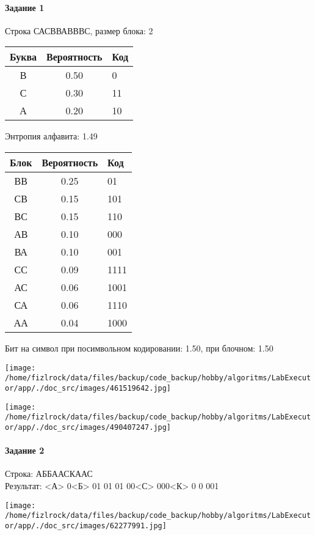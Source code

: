 \documentclass[a4paper, 12pt]{article}
\begin{document}
\paragraph{Задание 1}

Строка САСВВАВВВС, размер блока: 2
\begin{center}
 \begin{tabular}{ |c|c|l| } 
  \hline
     Буква & Вероятность & Код\\ \hline
В & 0.50 & 0\\\hline
С & 0.30 & 11\\\hline
А & 0.20 & 10
\\ \hline \end{tabular}
\end{center}
Энтропия алфавита: 1.49
\begin{center}
 \begin{tabular}{ |c|c|l| } 
  \hline
     Блок & Вероятность & Код\\ \hline
ВВ & 0.25 & 01\\\hline
СВ & 0.15 & 101\\\hline
ВС & 0.15 & 110\\\hline
АВ & 0.10 & 000\\\hline
ВА & 0.10 & 001\\\hline
СС & 0.09 & 1111\\\hline
АС & 0.06 & 1001\\\hline
СА & 0.06 & 1110\\\hline
АА & 0.04 & 1000
\\ \hline \end{tabular}
\end{center}
Бит на символ при посимвольном кодировании: 1.50, при блочном: 1.50

\texttt{[image: /home/fizlrock/data/files/backup/code\_backup/hobby/algoritms/LabExecutor/app/./doc\_src/images/461519642.jpg]}

\texttt{[image: /home/fizlrock/data/files/backup/code\_backup/hobby/algoritms/LabExecutor/app/./doc\_src/images/490407247.jpg]}
\pagebreak
\paragraph{Задание 2}

Строка: 
АББААСКААС\\
Результат: <А> 0<Б> 01 01 01 00<С> 000<К> 0 0 001

\texttt{[image: /home/fizlrock/data/files/backup/code\_backup/hobby/algoritms/LabExecutor/app/./doc\_src/images/62277991.jpg]}
\end{document}
